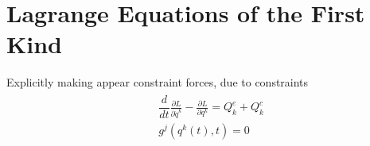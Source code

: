 \documentclass[letterpaper,10pt,english]{jupyterBook}
\begin{document}
\section{Lagrange Equations of the First Kind}
\label{\detokenize{ch/lagrange-i-type:lagrange-equations-of-the-first-kind}}\label{\detokenize{ch/lagrange-i-type:classical-mechanics-lagrange-i-type}}\label{\detokenize{ch/lagrange-i-type::doc}}
\sphinxAtStartPar
Explicitly making appear constraint forces, due to constraints
\begin{equation*}
\begin{split}\begin{aligned}
 & \dfrac{d}{dt}\frac{\partial L}{\partial \dot{q}^k} - \frac{\partial L}{\partial q^k} = Q^e_k + Q^c_k \\
 & g^j \left(q^k(t), t\right) = 0
\end{aligned}\end{split}
\end{equation*}\label{ch/lagrange-i-type:example-0}
\end{document}
